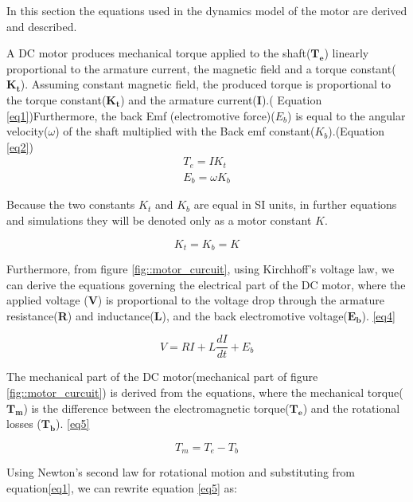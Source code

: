 {In this section the equations used in the dynamics model of the motor are derived and described.

A DC motor produces mechanical torque applied to the shaft($\boldsymbol{T_e}$) linearly proportional to the armature current, the magnetic field and a torque constant($\boldsymbol{K_t}$). Assuming constant magnetic field, the produced torque is proportional to the torque constant($\boldsymbol{K_t}$) and the armature current(\textbf{I}).( Equation \ref{eq1})Furthermore, the back Emf (electromotive force)($E_b$) is equal to the angular velocity($\omega$) of the shaft multiplied with the Back emf constant($K_b$).(Equation \ref{eq2}) \\

\begin{align}  
T_e = IK_t \label{eq1}\\
E_b = \omega K_b \label{eq2}
\end{align}

Because the two constants $K_t$ and $K_b$ are equal in SI units, in further equations and simulations they will be denoted only as a motor constant $K$.


\begin{equation} \label{eq3}
K_t = K_b = K
\end{equation} 

Furthermore, from figure \ref{fig::motor_curcuit}, using Kirchhoff's voltage law, we can derive the equations governing the electrical part of the DC motor, where the applied voltage (\textbf{V}) is proportional to the voltage drop through the armature resistance(\textbf{R}) and inductance(\textbf{L}), and the back electromotive voltage($\boldsymbol{E_b}$). \ref{eq4}

\begin{equation} \label{eq4}
V = RI + L\frac{dI}{dt} + E_b
\end{equation} 

The mechanical part of the DC motor(mechanical part of figure \ref{fig::motor_curcuit}) is derived from the equations, where the mechanical torque($\boldsymbol{T_m}$) is the difference between the electromagnetic torque($\boldsymbol{T_e}$) and the rotational losses ($\boldsymbol{T_b}$). \ref{eq5}

\begin{equation} \label{eq5} 
T_m = T_e - T_b
\end{equation} 

Using Newton's second law for rotational motion and substituting from equation\ref{eq1}, we can rewrite equation \ref{eq5} as:

}
